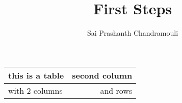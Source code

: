 \documentclass[a4paper,12pt,titlepage]{article} %
\author{Sai Prashanth Chandramouli}
\title{First Steps}
\begin{document}
	\begin{tabular}[t]{|l|r|} %
		\hline
		this is a table & second column \\
		\hline
		with 2 columns & and rows \\
		\hline
	\end{tabular}
\end{document}
